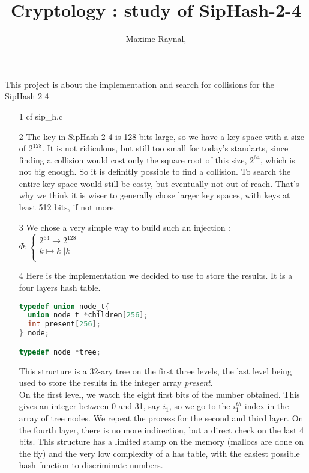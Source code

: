 \documentclass{article}
\title{Cryptology : study of SipHash-2-4}
\author{Maxime Raynal, }
\begin{document}
\maketitle


This project is about the implementation and search for collisions for the SipHash-2-4

\begin{itemize}
\item[1] cf sip\_h.c

\item[2] The key in SipHash-2-4 is 128 bits large, so we have a key space with a size of $2^{128}$. It is not ridiculous, but still too small for today's standarts, since finding a collision would cost only the square root of this size, $2^{64}$, which is not big enough. So it is definitly possible to find a collision. 
To search the entire key space would still be costy, but eventually not out of reach. That's why we think it is wiser to generally chose larger key spaces, with keys at least 512 bits, if not more.

\item[3] We chose a very simple way to build such an injection : \\
$\Phi : \begin{cases}
	2^{64} \rightarrow 2^{128}\\
	k \mapsto k || k\\
		\end{cases}$

\item[4] Here is the implementation we decided to use to store the results. It is a four layers hash table. 

\begin{lstlisting}[language = C]
typedef union node_t{
  union node_t *children[256];
  int present[256];
} node;

typedef node *tree;
\end{lstlisting}

This structure is a 32-ary tree on the first three levels, the last level being used to store the results in the integer array \textit{present}.\\
On the first level, we watch the eight first bits of the number obtained. This gives an integer between 0 and 31, say $i_1$, so we go to the $i_1^{th}$ index in the array of tree nodes. We repeat the process for the second and third layer. On the fourth layer, there is no more indirection, but a direct check on the last 4 bits.
This structure has a limited stamp on the memory (mallocs are done on the fly) and the very low complexity of a has table, with the easiest possible hash function to discriminate numbers.


\end{itemize}
\end{document}
